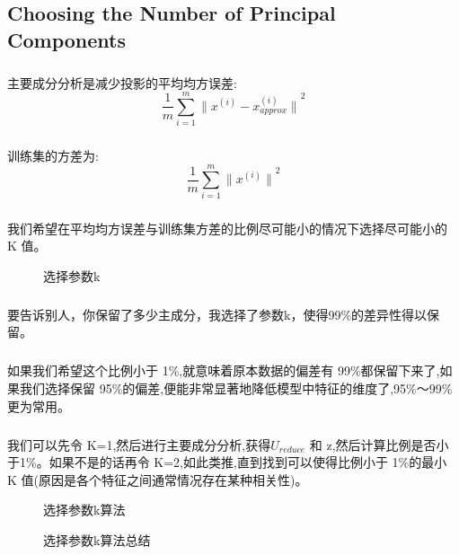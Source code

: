 \documentclass{article}
\begin{document}
\begin{CJK}{UTF8}{gbsn}
\subsection{Choosing the Number of Principal Components}
\subparagraph{}
主要成分分析是减少投影的平均均方误差:
\begin{equation}
\frac{1}{m}\sum_{i=1}^m{\parallel{x^{(i)}-x_{approx}^{(i)}}\parallel}^2
\end{equation}
\subparagraph{}
训练集的方差为:
\begin{equation}
\frac{1}{m}\sum_{i=1}^m{\parallel{x^{(i)}}\parallel}^2
\end{equation}
\subparagraph{}
我们希望在平均均方误差与训练集方差的比例尽可能小的情况下选择尽可能小的 K 值。
\begin{figure}[H]
\caption{选择参数k}
\label{fig:860}
\end{figure}
\subparagraph{}
要告诉别人，你保留了多少主成分，我选择了参数k，使得99\%{}的差异性得以保留。
\subparagraph{}
如果我们希望这个比例小于 1\%{},就意味着原本数据的偏差有 99\%{}都保留下来了,如果我们选择保留 95\%{}的偏差,便能非常显著地降低模型中特征的维度了,95\%{}～99\%{}更为常用。
\subparagraph{}
我们可以先令 K=1,然后进行主要成分分析,获得$U_{reduce}$ 和 z,然后计算比例是否小于1\%{}。如果不是的话再令 K=2,如此类推,直到找到可以使得比例小于 1\%{}的最小 K 值(原因是各个特征之间通常情况存在某种相关性)。
\begin{figure}[H]
\caption{选择参数k算法}
\label{fig:861}
\end{figure}
\begin{figure}[H]
\caption{选择参数k算法总结}
\label{fig:863}
\end{figure}
\begin{figure}[H]
\label{fig:862}
\end{figure}

\end{CJK}
\end{document}
